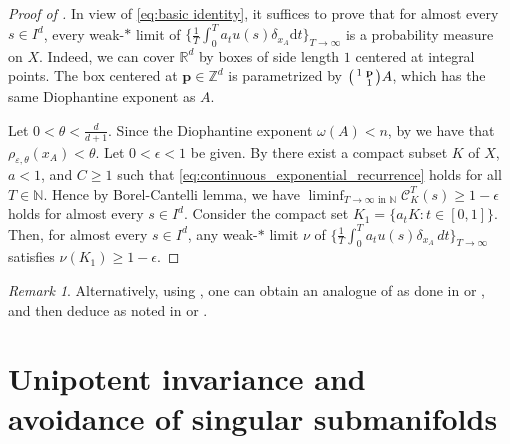 \documentclass[12pt,reqno]{amsart}
\numberwithin{equation}{section}
\theoremstyle{plain}
\theoremstyle{definition}
\theoremstyle{remark}
\newtheorem{remark}{Remark}[section]
\newcommand\bfp{\mathbf{p}}
\newcommand{\R}{\mathbb{R}}
\newcommand{\Z}{\mathbb{Z}}
\newcommand{\N}{\mathbb{N}}
\newcommand{\eps}{\varepsilon}
\newcommand{\de}{\mathrm{d}}
\begin{document}
	\begin{proof}[Proof of ]
		In view of \eqref{eq:basic identity}, it suffices to prove that for almost every $s\in I^d$, every weak-$\ast$ limit of $\{ \frac{1}{T}\int_{0}^{T}a_tu(s)\delta_{x_A}\de t \}_{T\to \infty}$ is a probability measure on $X$. Indeed, we can cover $\R^d$ by boxes of side length $1$ centered at integral points. The box centered at $\bfp\in\Z^d$ is parametrized by $\begin{psmallmatrix}
		    1&\bfp\\&1
		\end{psmallmatrix}A$, which has the same Diophantine exponent as $A$. 
		
		Let $0<\theta<\frac{d}{d+1}$. Since the Diophantine exponent $\omega(A)<n$, by \cite[Proposition 4.1]{SY24TAMS} we  have that $\rho_{\eps,\theta}(x_A)<\theta$. Let $0<\epsilon<1$ be given. By  there exist a compact subset $K$ of $X$, $a<1$, and $C\geq1$ such that \eqref{eq:continuous_exponential_recurrence} holds for all $T\in\N$. Hence by Borel-Cantelli lemma, we have $\liminf_{T\to\infty \text{ in } \N}\mathcal{C}_K^T(s)\geq 1-\epsilon$ holds for almost every $s\in I^d$. Consider the compact set $K_1=\{a_tK:t\in [0,1]\}$. Then, for almost every $s\in I^d$, any weak-$\ast$ limit $\nu$ of $\{\frac{1}{T}\int_0^Ta_tu(s)\delta_{x_A}\,dt\}_{T\to\infty}$ satisfies $\nu(K_1)\geq 1-\epsilon$.
	\end{proof}

    \begin{remark} \label{rem:alternate}
        Alternatively, using , one can obtain an analogue of  as done in \cite[Theorem~1.5]{KKLM17} or \cite[Proposition~4.8]{Kha20}, and then deduce  as noted in \cite[Remark~2.1]{KKLM17} or \cite[Theorem~4.3(b)]{Kha20}.
    \end{remark}



    
	\section{Unipotent invariance and avoidance of singular submanifolds}
	\label{sec:Sing}
\end{document}
